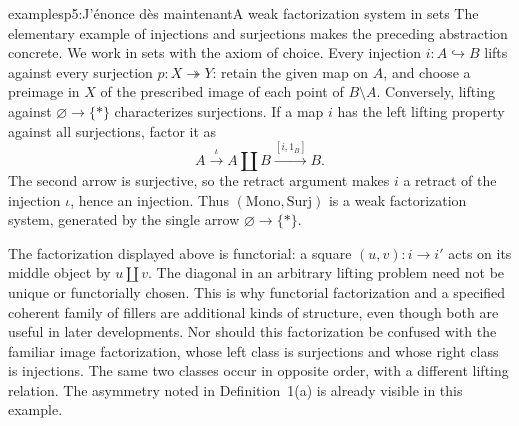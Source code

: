 \begin{dcomment}{examples}{p5:J'énonce dès maintenant}{A weak factorization system in sets}
The elementary example of injections and surjections makes the preceding abstraction concrete. We work in sets with the axiom of choice. Every injection $i:A\hookrightarrow B$ lifts against every surjection $p:X\twoheadrightarrow Y$: retain the given map on $A$, and choose a preimage in $X$ of the prescribed image of each point of $B\setminus A$. Conversely, lifting against $\varnothing\to\{*\}$ characterizes surjections. If a map $i$ has the left lifting property against all surjections, factor it as
\[
 A\xrightarrow{\iota} A\amalg B
     \xrightarrow{[i,1_B]} B.
\]
The second arrow is surjective, so the retract argument makes $i$ a retract of the injection $\iota$, hence an injection. Thus $(\mathrm{Mono},\mathrm{Surj})$ is a weak factorization system, generated by the single arrow $\varnothing\to\{*\}$.

The factorization displayed above is functorial: a square $(u,v):i\to i'$ acts on its middle object by $u\amalg v$. The diagonal in an arbitrary lifting problem need not be unique or functorially chosen. This is why functorial factorization and a specified coherent family of fillers are additional kinds of structure, even though both are useful in later developments. Nor should this factorization be confused with the familiar image factorization, whose left class is surjections and whose right class is injections. The same two classes occur in opposite order, with a different lifting relation. The asymmetry noted in Definition~1(a) is already visible in this example.
\end{dcomment}

